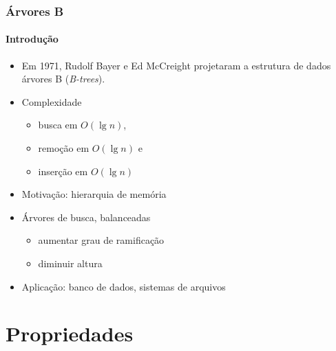 \documentclass{beamer}
\begin{document}
\begin{frame}

  \frametitle{Árvores B}
  \framesubtitle{Introdução}

  
  \begin{itemize}
    
  \item Em 1971, Rudolf Bayer e Ed McCreight projetaram a estrutura de dados
    \alert{árvores B} (\textit{B-trees\/}).

  \item Complexidade
    \begin{itemize}
    \item busca em $O(\lg n)$, 
    \item remoção em $O(\lg n)$ e
    \item inserção em $O(\lg n)$
    \end{itemize}

  \item Motivação: hierarquia de memória

  \item Árvores de busca, balanceadas 

    \begin{itemize}

      \item aumentar grau de ramificação

      \item diminuir altura

    \end{itemize}

  \item Aplicação: banco de dados, sistemas de arquivos

  \end{itemize}

\end{frame}

\section{Propriedades}
\end{document}
